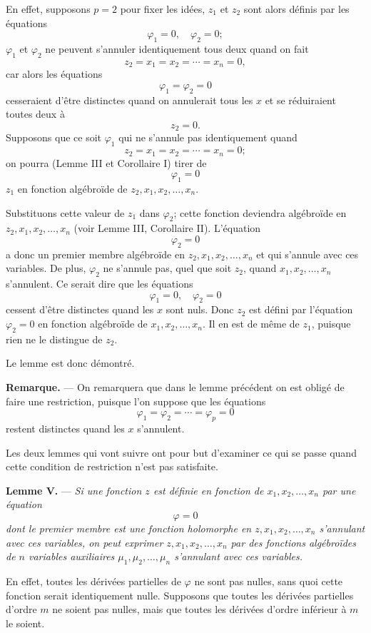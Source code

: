 \documentclass[11pt]{article}
\begin{document}
En effet, supposons $p=2$ pour fixer les idées, $z_1$ et $z_2$ sont alors définis par les équations
\[
\varphi_1=0,
\quad \varphi_2=0;
\]
$\varphi_1$ et $\varphi_2$ ne peuvent s'annuler identiquement tous deux quand on fait
\[
z_2=x_1=x_2=\cdots=x_n=0,
\]
car alors les équations
\[
\varphi_1=\varphi_2=0
\]
cesseraient d'être distinctes quand on annulerait tous les $x$ et se réduiraient toutes deux à
\[
z_2=0.
\]
Supposons que ce soit $\varphi_1$ qui ne s'annule pas identiquement quand
\[
z_2=x_1=x_2=\cdots=x_n=0;
\]
on pourra (Lemme III et Corollaire I) tirer de
\[
\varphi_1=0
\]
$z_1$ en fonction algébroïde de $z_2,x_1,x_2,\ldots,x_n$.

Substituons cette valeur de $z_1$ dans $\varphi_2$; cette fonction deviendra algébroïde en $z_2,x_1,x_2,\ldots,x_n$ (voir Lemme III, Corollaire II). L'équation
\[
\varphi_2=0
\]
a donc un premier membre algébroïde en $z_2,x_1,x_2,\ldots,x_n$ et qui s'annule avec ces variables. De plus, $\varphi_2$ ne s'annule pas, quel que soit $z_2$, quand $x_1,x_2,\ldots,x_n$ s'annulent. Ce serait dire que les équations
\[
\varphi_1=0,
\quad \varphi_2=0
\]
cessent d'être distinctes quand les $x$ sont nuls. Donc $z_2$ est défini par l'équation $\varphi_2=0$ en fonction algébroïde de $x_1,x_2,\ldots,x_n$. Il en est de même de $z_1$, puisque rien ne le distingue de $z_2$.

Le lemme est donc démontré.

\medskip
\noindent\textbf{Remarque.} — On remarquera que dans le lemme précédent on est obligé de faire une restriction, puisque l'on suppose que les équations
\[
\varphi_1=\varphi_2=\cdots=\varphi_p=0
\]
restent distinctes quand les $x$ s'annulent.

Les deux lemmes qui vont suivre ont pour but d'examiner ce qui se passe quand cette condition de restriction n'est pas satisfaite.

\medskip
\noindent\textbf{Lemme V.} — \emph{Si une fonction $z$ est définie en fonction de $x_1,x_2,\ldots,x_n$ par une équation}
\[
\varphi=0
\]
\emph{dont le premier membre est une fonction holomorphe en $z,x_1,x_2,\ldots,x_n$ s'annulant avec ces variables, on peut exprimer $z,x_1,x_2,\ldots,x_n$ par des fonctions algébroïdes de $n$ variables auxiliaires $\mu_1,\mu_2,\ldots,\mu_n$ s'annulant avec ces variables.}

En effet, toutes les dérivées partielles de $\varphi$ ne sont pas nulles, sans quoi cette fonction serait identiquement nulle. Supposons que toutes les dérivées partielles d'ordre $m$ ne soient pas nulles, mais que toutes les dérivées d'ordre inférieur à $m$ le soient.
\end{document}
